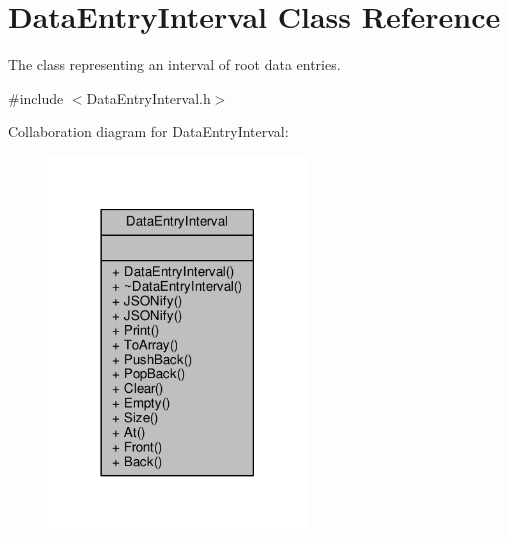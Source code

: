 \hypertarget{classDataEntryInterval}{\section{Data\+Entry\+Interval Class Reference}
\label{classDataEntryInterval}
}


The class representing an interval of root data entries.  




{\ttfamily \#include $<$Data\+Entry\+Interval.\+h$>$}



Collaboration diagram for Data\+Entry\+Interval\+:
\nopagebreak
\begin{figure}[H]
\begin{center}
\leavevmode
\includegraphics[width=194pt]{classDataEntryInterval__coll__graph}
\end{center}
\end{figure}
